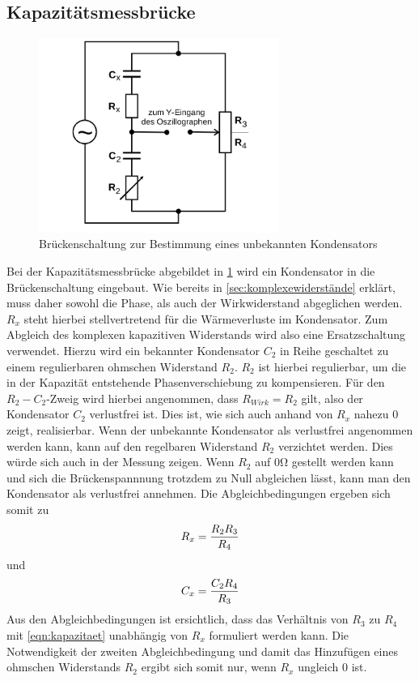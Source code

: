 \subsection{Kapazitätsmessbrücke}
\begin{figure}
  \centering
  \includegraphics[width=0.7\textwidth]{Bilder/kapazitaetmessbruecke.png}
  \caption{Brückenschaltung zur Bestimmung eines unbekannten Kondensators \cite{Anleitung}}
  \label{fig:kapazitätsmessbrücke}
\end{figure}
Bei der Kapazitätsmessbrücke abgebildet in \ref{fig:kapazitätsmessbrücke} wird ein Kondensator in die Brückenschaltung eingebaut.
Wie bereits in \ref{sec:komplexewiderstände} erklärt, muss daher sowohl die Phase, als auch der Wirkwiderstand abgeglichen werden.
$R_x$ steht hierbei stellvertretend für die Wärmeverluste im Kondensator. Zum Abgleich des komplexen kapazitiven Widerstands wird also eine Ersatzschaltung verwendet.
Hierzu wird ein bekannter Kondensator $C_2$ in Reihe geschaltet zu einem regulierbaren ohmschen Widerstand $R_2$.
$R_2$ ist hierbei regulierbar, um die in der Kapazität entstehende Phasenverschiebung zu kompensieren. Für den $R_2-C_2$-Zweig wird hierbei angenommen, dass $R_{Wirk}=R_2$ gilt, also der Kondensator $C_2$ verlustfrei ist. Dies ist, wie sich auch anhand von $R_x$ nahezu 0 zeigt, realisierbar.
Wenn der unbekannte Kondensator als verlustfrei angenommen werden kann, kann auf den regelbaren Widerstand $R_2$ verzichtet werden.
Dies würde sich auch in der Messung zeigen. Wenn $R_2$ auf $0 \si{\ohm}$ gestellt werden kann und sich die Brückenspannnung trotzdem zu Null abgleichen lässt, kann man den Kondensator als verlustfrei annehmen.
Die Abgleichbedingungen ergeben sich somit zu
\begin{equation}
\centering
\label{eqn:kapwiderstand}
R_x=\frac{R_2R_3}{R_4}
\end{equation}
und
\begin{equation}
\centering
\label{eqn:kapazitaet}
C_x=\frac{C_2R_4}{R_3}
\end{equation}
Aus den Abgleichbedingungen ist ersichtlich, dass das Verhältnis von $R_3$ zu $R_4$ mit \eqref{eqn:kapazitaet} unabhängig von $R_x$ formuliert werden kann.
Die Notwendigkeit der zweiten Abgleichbedingung und damit das Hinzufügen eines ohmschen Widerstands $R_2$ ergibt sich somit nur, wenn $R_x$ ungleich 0 ist.

